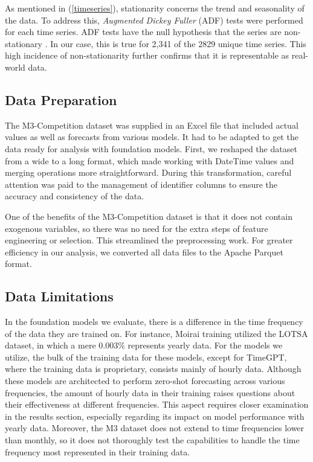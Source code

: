 \documentclass[12pt,a4paper]{article}
\begin{document}
As mentioned in (\ref{timeseries}), stationarity concerns the trend and seasonality of the data. To address this, \textit{Augmented Dickey Fuller} (ADF) tests were performed for each time series. ADF tests have the null hypothesis that the series are non-stationary \parencite{HyndmanForecasting2021}. In our case, this is true for 2,341 of the 2829 unique time series. This high incidence of non-stationarity further confirms that it is representable as real-world data. 

\subsection{Data Preparation}

The M3-Competition dataset was supplied in an Excel file that included actual values as well as forecasts from various models. It had to be adapted to get the data ready for analysis with foundation models. First, we reshaped the dataset from a wide to a long format, which made working with DateTime values and merging operations more straightforward. During this transformation, careful attention was paid to the management of identifier columns to ensure the accuracy and consistency of the data.

One of the benefits of the M3-Competition dataset is that it does not contain exogenous variables, so there was no need for the extra steps of feature engineering or selection. This streamlined the preprocessing work. For greater efficiency in our analysis, we converted all data files to the Apache Parquet format.

\subsection{Data Limitations}
In the foundation models we evaluate, there is a difference in the time frequency of the data they are trained on. For instance, Moirai training utilized the LOTSA dataset, in which a mere 0.003\% represents yearly data. For the models we utilize, the bulk of the training data for these models, except for TimeGPT, where the training data is proprietary, consists mainly of hourly data. Although these models are architected to perform zero-shot forecasting across various frequencies, the amount of hourly data in their training raises questions about their effectiveness at different frequencies. This aspect requires closer examination in the results section, especially regarding its impact on model performance with yearly data. Moreover, the M3 dataset does not extend to time frequencies lower than monthly, so it does not thoroughly test the capabilities to handle the time frequency most represented in their training data.
\end{document}
